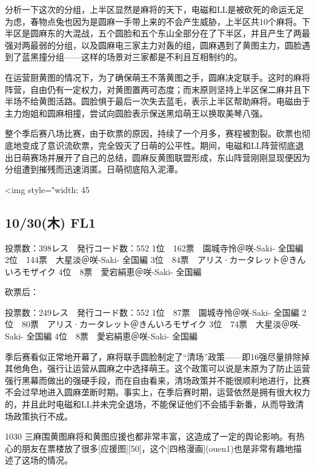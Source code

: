分析一下这次的分组，上半区显然是麻将的天下，电磁和LL是被砍死的命运无足为虑，春物点兔也因为是圆麻一手带上来的不会产生威胁，上半区共10个麻将。下半区是圆麻东的大混战，五个圆脸和五个东山全部分在了下半区，并且产生了两最强对两最弱的分组，以及圆麻电三家主力对轰的组，圆麻遇到了黄图主力，圆脸遇到了蓝黑撞分组——这样的场景对三家都是不利且互相制约的。

在运营厨黄图的情况下，为了确保萌王不落黄图之手，圆麻决定联手。这时的麻将阵营，自由仍有一定权力，对黄图置两可态度；而末原则坚持上半区保二麻并且下半场不给黄图活路。圆脸惧于最后一次失去蓝毛，表示上半区帮助麻将。电磁由于主力炮姐和圆麻相撞，尝试向圆脸表示保送黑焰萌王以换取美琴八强。

整个季后赛八场比赛，由于砍票的原因，持续了一个月多，赛程被割裂。砍票也彻底地变成了意识流砍票，完全毁灭了日萌的公平性。期间，电磁和LL阵营彻底退出日萌赛场并展开了自己的总结，圆麻反黄图联盟形成，东山阵营刚刚显现便因为分组遭到摧残而迅速消匿。日萌彻底陷入泥潭。

<img style="width: 45%

\subsection{10/30(木) FL1}

    投票数：398レス　発行コード数：552
    1位　162票　園城寺怜＠咲-Saki- 全国編
    2位　144票　大星淡＠咲-Saki- 全国編
    3位　84票　アリス·カータレット＠きんいろモザイク
    4位　8票　愛宕絹恵＠咲-Saki- 全国編

砍票后：

    投票数：249レス　発行コード数：552
    1位　87票　園城寺怜＠咲-Saki- 全国編
    2位　80票　アリス·カータレット＠きんいろモザイク
    3位　74票　大星淡＠咲-Saki- 全国編
    4位　8票　愛宕絹恵＠咲-Saki- 全国編

季后赛看似正常地开幕了，麻将联手圆脸制定了“清场”政策——即16强尽量排除掉其他角色，强行让运营从圆麻之中选择萌王。这个政策可以说是末原为了防止运营强行黑幕而做出的强硬手段，而在自由看来，清场政策并不能很顺利地进行，比赛不会过早地进入圆麻垄断时期。事实上，在季后赛时期，运营依然是拥有很大权力的，并且此时电磁和LL并未完全退场，不能保证他们不会插手新番，从而导致清场政策执行不成。

1030 三麻围黄图麻将和黄图应援也都非常丰富，这造成了一定的舆论影响。有热心的朋友在票楼放了很多[应援图][50]，这个[四格漫画](ouen1)也是非常有趣地描述了这场的情况。

